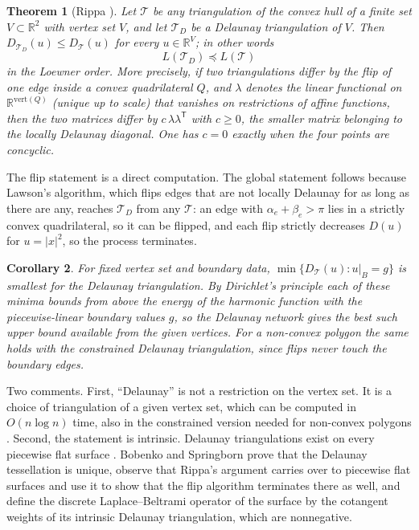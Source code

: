 \documentclass[11pt]{amsart}
\newtheorem{theorem}{Theorem}[section]
\newtheorem{corollary}[theorem]{Corollary}
\theoremstyle{definition}
\theoremstyle{remark}
\newcommand{\R}{\mathbb{R}}
\newcommand{\cT}{\mathcal{T}}
\newcommand{\lo}{\preccurlyeq}
\begin{document}
\begin{theorem}[Rippa \cite{Rip90}]\label{thm:rippa}
Let $\cT$ be any triangulation of the convex hull of a finite set $V\subset\R^2$ with vertex set $V$, and let $\cT_D$ be a Delaunay triangulation of $V$.
Then $D_{\cT_D}(u)\le D_{\cT}(u)$ for every $u\in\R^V$; in other words
\[
L(\cT_D)\lo L(\cT)
\]
in the Loewner order. More precisely, if two triangulations differ by the flip of one edge inside a convex quadrilateral $Q$, and $\lambda$ denotes the linear
functional on $\R^{\mathrm{vert}(Q)}$ \textup{(}unique up to scale\textup{)} that vanishes on restrictions of affine functions, then the two matrices differ by
$c\,\lambda\lambda^{\mathsf T}$ with $c\ge0$, the smaller matrix belonging to the locally Delaunay diagonal. One has $c=0$ exactly when the four points are concyclic.
\end{theorem}

The flip statement is a direct computation. The global statement follows because Lawson's algorithm, which flips edges that are not locally Delaunay for as long as there are any,
reaches $\cT_D$ from any $\cT$: an edge with $\alpha_e+\beta_e>\pi$ lies in a strictly convex quadrilateral, so it can be flipped,
and each flip strictly decreases $D(u)$ for $u=|x|^2$, so the process terminates.

\begin{corollary}
For fixed vertex set and boundary data, $\min\{D_{\cT}(u):u|_B=g\}$ is smallest for the Delaunay triangulation.
By Dirichlet's principle each of these minima bounds from above the energy of the harmonic function with the piecewise-linear boundary values $g$,
so the Delaunay network gives the best such upper bound available from the given vertices.
For a non-convex polygon the same holds with the constrained Delaunay triangulation, since flips never touch the boundary edges.
\end{corollary}

Two comments. First, ``Delaunay'' is not a restriction on the vertex set. It is a choice of triangulation of a given vertex set, which can be computed in $O(n\log n)$ time,
also in the constrained version needed for non-convex polygons \cite{Chew89}. Second, the statement is intrinsic. Delaunay triangulations exist on every piecewise flat surface \cite{Riv94,ILTC01}. Bobenko and Springborn \cite{BS07} prove that the Delaunay tessellation is unique,
observe that Rippa's argument carries over to piecewise flat surfaces and use it to show that the flip algorithm terminates there as well, and define the
discrete Laplace--Beltrami operator of the surface by the cotangent weights of its intrinsic Delaunay triangulation, which are nonnegative.
\end{document}
